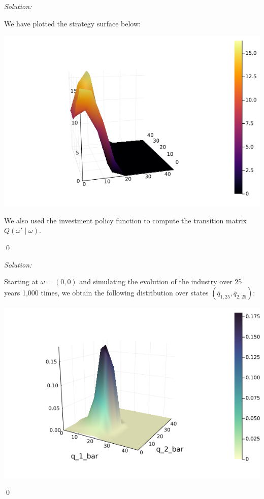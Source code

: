 \documentclass[12pt]{article}
\newenvironment{problem}[2][Problem]{\begin{trivlist}
\item[\hskip \labelsep {\bfseries #1}\hskip \labelsep {\bfseries #2.}]}{\end{trivlist}}
\newenvironment{sol}
    {\emph{Solution:}
    }
    {
    \qed
    }
\begin{document}
\begin{problem}{4}
\end{problem}
\begin{sol}
    We have plotted the strategy surface below:
    \begin{center}\includegraphics[scale=0.5]{xplot.png}\end{center}
    We also used the investment policy function to compute the transition matrix $Q(\omega'\mid \omega)$.
\end{sol}
\begin{problem}{5}
\end{problem}
\begin{sol}
    Starting at $\omega = (0,0)$ and simulating the evolution of the industry over 25 years 1,000 times, we obtain the following distribution over states $(\bar{q}_{1, 25}, \bar{q}_{2,25})$:
    \begin{center}
        \includegraphics[scale=0.5]{simplot.png}
    \end{center}
\end{sol}
\end{document}
